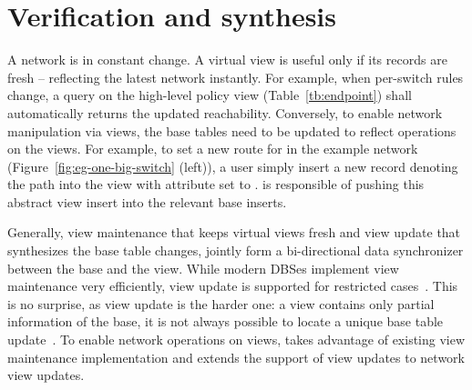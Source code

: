 \section{Verification and synthesis}
\label{sec:veri-syn}



A network is in constant change. A virtual view is useful only if its
records are fresh -- reflecting the latest network instantly. For
example, when per-switch rules change, a query on the high-level
policy view  (Table~\ref{tb:endpoint}) shall
automatically returns the updated  reachability. Conversely,
to enable network manipulation via views, the base tables need to be
updated to reflect operations on the views.  For example, to set a new
route  for  in the example network
(Figure~\ref{fig:eg-one-big-switch} (left)), a user simply insert a new
record denoting the path into the  view with
 attribute set to . \Sys is responsible of pushing this
abstract view insert into the relevant base 
inserts.

Generally, view maintenance that keeps virtual views fresh and view
update that synthesizes the base table changes, jointly form a
bi-directional data synchronizer between the base and the view. While
modern DBSes implement view maintenance very efficiently, view update
is supported for restricted
cases~\cite{ak-view-udpate-thesis,relational-lenses}. This is no
surprise, as view update is the harder one: a view contains only partial
information of the base, it is not always possible to locate a unique
base table update~\cite{Bancilhon:view-update-semantics}. To enable
network operations on views, \Sys takes advantage of existing view
maintenance implementation and extends the support of view updates to
network view updates.


